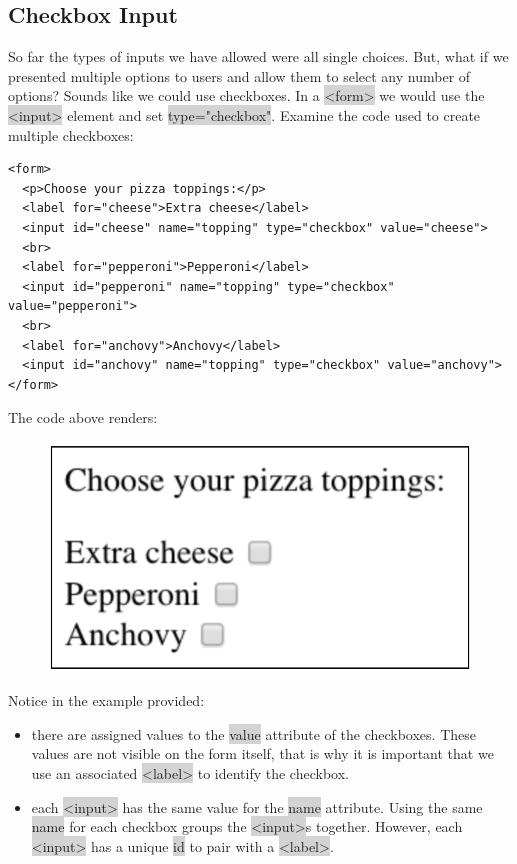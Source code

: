 \documentclass[11pt]{article}
\begin{document}
\subsection{Checkbox Input}
So far the types of inputs we have allowed were all single choices. But, what if we presented multiple options to users and allow them to select any number of options? Sounds like we could use checkboxes. In a \colorbox{lightgray}{<form>} we would use the \colorbox{lightgray}{<input>} element and set \colorbox{lightgray}{type="checkbox"}. Examine the code used to create multiple checkboxes:
\begin{lstlisting}
<form>
  <p>Choose your pizza toppings:</p>
  <label for="cheese">Extra cheese</label>
  <input id="cheese" name="topping" type="checkbox" value="cheese">
  <br>
  <label for="pepperoni">Pepperoni</label>
  <input id="pepperoni" name="topping" type="checkbox" value="pepperoni">
  <br>
  <label for="anchovy">Anchovy</label>
  <input id="anchovy" name="topping" type="checkbox" value="anchovy">
</form>
\end{lstlisting}
The code above renders:
\begin{figure}[H]
\includegraphics[scale = 0.5]{3_9}
\centering
\end{figure}
\vspace{-4mm}
Notice in the example provided:
\begin{itemize}[leftmargin = *]
\item there are assigned values to the \colorbox{lightgray}{value} attribute of the checkboxes. These values are not visible on the form itself, that is why it is important that we use an associated \colorbox{lightgray}{<label>} to identify the checkbox.
\item each \colorbox{lightgray}{<input>} has the same value for the \colorbox{lightgray}{name} attribute. Using the same \colorbox{lightgray}{name} for each checkbox groups the \colorbox{lightgray}{<input>}s together. However, each \colorbox{lightgray}{<input>} has a unique \colorbox{lightgray}{id} to pair with a \colorbox{lightgray}{<label>}.
\end{itemize}
\end{document}
